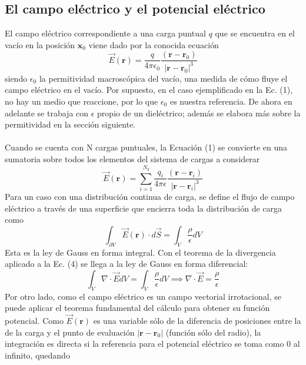 \documentclass[12pt, notitlepage]{article}
\numberwithin{equation}{section}
\begin{document}
\subsection{El campo eléctrico y el potencial eléctrico}
El campo eléctrico correspondiente a una carga puntual $q$ que se encuentra en el vacío en la posición $\mathbf{x}_0$ viene dado por la conocida ecuación
\begin{equation}
\vec{E}(\mathbf{r}) = \frac{q}{4\pi\epsilon_0}\frac{(\mathbf{r} - \mathbf{r}_0)}{|\mathbf{r}-\mathbf{r}_0|^3}
\end{equation}
siendo $\epsilon_0$ la permitividad macroscópica del vacío, una medida de cómo fluye el campo eléctrico en el vacío. Por supuesto, en el caso ejemplificado en la Ec. (1), no hay un medio que reaccione, por lo que $\epsilon_0$ es nuestra referencia. De ahora en adelante se trabaja con $\epsilon$ propio de un dieléctrico; además se elabora más sobre la permitividad en la sección siguiente.\\\\
Cuando se cuenta con N cargas puntuales, la Ecuación (1) se convierte en una sumatoria sobre todos los elementos del sistema de cargas a considerar
\begin{equation}
\vec{E}(\mathbf{r}) = \sum_{i=1}^{N_q}\frac{q_i}{4\pi\epsilon}\frac{(\mathbf{r} - \mathbf{r}_i)}{|\mathbf{r}-\mathbf{r}_i|^3}
\end{equation}
Para un caso con una distribución continua de carga, se define el flujo de campo eléctrico a través de una superficie que encierra toda la distribución de carga como
\begin{equation}
\int_{\partial V}\vec{E}(\mathbf{r})\cdot d\vec{S} = \int_V \frac{\rho}{\epsilon} dV
\end{equation}
Esta es la ley de Gauss en forma integral. Con el teorema de la divergencia aplicado a la Ec. (4) se llega a la ley de Gauss en forma diferencial:
\begin{equation}
\int_V \nabla\cdot\vec{E} dV = \int_V \frac{\rho}{\epsilon}dV \implies \nabla\cdot\vec{E} = \frac{\rho}{\epsilon}
\end{equation}
Por otro lado, como el campo eléctrico es un campo vectorial irrotacional, se puede aplicar el teorema fundamental del cálculo para obtener su función potencial. Como $\vec{E}(\mathbf{r})$ es una variable sólo de la diferencia de posiciones entre la de la carga y el punto de evaluación $|\mathbf{r} - \mathbf{r}_0|$ (función sólo del radio), la integración es directa si la referencia para el potencial eléctrico se toma como $0$ al infinito, quedando
\end{document}
